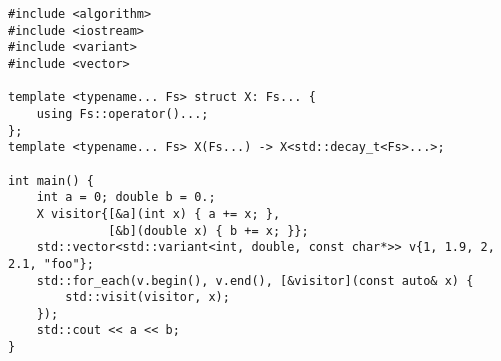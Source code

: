 \begin{lstlisting}[title=\href{https://godbolt.org/z/qYwPjF}{\texttt{godbolt.org/z/qYwPjF}}]
#include <algorithm>
#include <iostream>
#include <variant>
#include <vector>

template <typename... Fs> struct X: Fs... {
    using Fs::operator()...;
};
template <typename... Fs> X(Fs...) -> X<std::decay_t<Fs>...>;

int main() {
    int a = 0; double b = 0.;
    X visitor{[&a](int x) { a += x; },
              [&b](double x) { b += x; }};
    std::vector<std::variant<int, double, const char*>> v{1, 1.9, 2, 2.1, "foo"};
    std::for_each(v.begin(), v.end(), [&visitor](const auto& x) {
        std::visit(visitor, x);
    });
    std::cout << a << b;
}
\end{lstlisting}
